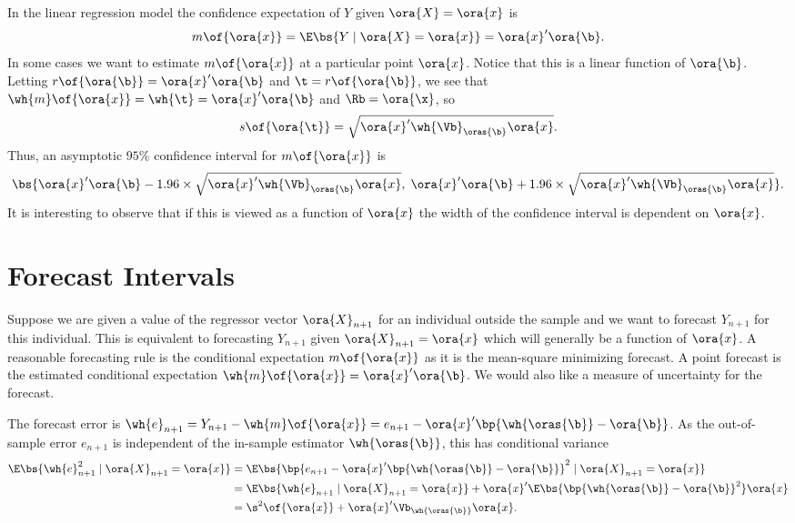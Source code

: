 In the linear regression model the confidence expectation of $Y$ given $\ora{X} = \ora{x}$ is 
\begin{equation}
    \notag 
    m\of{\ora{x}} = \E\bs{Y \mid \ora{X} = \ora{x}} = \ora{x}^{\prime} \ora{\b}.
\end{equation}
In some cases we want to estimate $m\of{\ora{x}}$ at a particular point $\ora{x}$. Notice that this is a linear function of $\ora{\b}$. Letting $r\of{\ora{\b}} = \ora{x}^{\prime} \ora{\b}$ and $\t = r\of{\ora{\b}}$, we see that $\wh{m}\of{\ora{x}} = \wh{\t} = \ora{x}^{\prime} \ora{\b}$ and $\Rb = \ora{\x}$, so 
$$
s\of{\ora{\t}} = \sqrt{\ora{x}^{\prime} \wh{\Vb}_{\oras{\b}} \ora{x}}.
$$
Thus, an asymptotic $95\%$ confidence interval for $m\of{\ora{x}}$ is 
\begin{equation}
    \notag 
    \bs{\ora{x}^{\prime}\ora{\b} - 1.96 \times \sqrt{\ora{x}^{\prime} \wh{\Vb}_{\oras{\b}} \ora{x}},\; \ora{x}^{\prime}\ora{\b} + 1.96 \times \sqrt{\ora{x}^{\prime} \wh{\Vb}_{\oras{\b}} \ora{x}}}.
\end{equation}
It is interesting to observe that if this is viewed as a function of $\ora{x}$ the width of the confidence interval is dependent on $\ora{x}$.

\section{Forecast Intervals}

Suppose we are given a value of the regressor vector $\ora{X}_{n+1}$ for an individual outside the sample and we want to forecast $Y_{n+1}$ for this individual. This is equivalent to forecasting $Y_{n+1}$ given $\ora{X}_{n+1} = \ora{x}$ which will generally be a function of $\ora{x}$. A reasonable forecasting rule is the conditional expectation $m\of{\ora{x}}$ as it is the mean-square minimizing forecast. A point forecast is the estimated conditional expectation $\wh{m}\of{\ora{x}} = \ora{x}^{\prime} \ora{\b}$. We would also like a measure of uncertainty for the forecast.

The forecast error is $\wh{e}_{n+1} = Y_{n+1} - \wh{m}\of{\ora{x}} = e_{n+1} - \ora{x}^{\prime} \bp{\wh{\oras{\b}} - \ora{\b}}$. As the out-of-sample error $e_{n+1}$ is independent of the in-sample estimator $\wh{\oras{\b}}$, this has conditional variance 
\begin{equation}
    \label{hansen_eq_7_36}
    \begin{aligned}
        \E\bs{\wh{e}_{n+1}^2 \mid \ora{X}_{n+1} = \ora{x}} & = \E\bs{\bp{e_{n+1} - \ora{x}^{\prime} \bp{\wh{\oras{\b}} - \ora{\b}}}^2 \mid \ora{X}_{n+1} = \ora{x}} \\
        & = \E\bs{\wh{e}_{n+1} \mid \ora{X}_{n+1} = \ora{x}} + \ora{x}^{\prime} \E\bs{\bp{\wh{\oras{\b}} - \ora{\b}}^2} \ora{x} \\
        & = \s^2\of{\ora{x}} + \ora{x}^{\prime} \Vb_{\wh{\oras{\b}}} \ora{x}.
    \end{aligned}
\end{equation}

